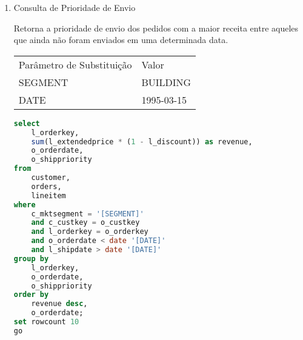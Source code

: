 \begin{enumerate}

\item Consulta de Prioridade de Envio
	
	Retorna a prioridade de envio dos pedidos com a maior receita entre aqueles que ainda não foram enviados em uma determinada data.
	
\begin{tabular}{ll}
	Parâmetro de Substituição & Valor\\
	SEGMENT & BUILDING\\
	DATE & 1995-03-15\\
\end{tabular}

	\begin{lstlisting}[language=SQL]
select
	l_orderkey,
	sum(l_extendedprice * (1 - l_discount)) as revenue,
	o_orderdate,
	o_shippriority
from
	customer,
	orders,
	lineitem
where
	c_mktsegment = '[SEGMENT]'
	and c_custkey = o_custkey
	and l_orderkey = o_orderkey
	and o_orderdate < date '[DATE]'
	and l_shipdate > date '[DATE]'
group by
	l_orderkey,
	o_orderdate,
	o_shippriority
order by
	revenue desc,
	o_orderdate;
set rowcount 10
go
	\end{lstlisting}
	
		
	

\end{enumerate}
